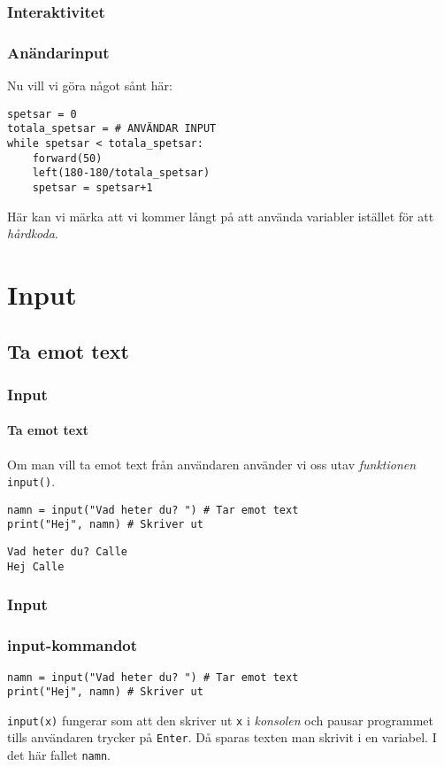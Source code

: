 \documentclass[aspectratio=169]{beamer}
\begin{document}
\begin{frame}[fragile]
	\frametitle{Interaktivitet}
	\frametitle{Anändarinput}
	
	Nu vill vi göra något sånt här:
	
	\begin{lstlisting}
spetsar = 0
totala_spetsar = # ANVÄNDAR INPUT
while spetsar < totala_spetsar:
    forward(50)
    left(180-180/totala_spetsar)
    spetsar = spetsar+1
	\end{lstlisting}
	
	\pause
	
	Här kan vi märka att vi kommer långt på att använda variabler istället för att \textit{hårdkoda}.
	
\end{frame}

\section{Input}

\subsection{Ta emot text}

\begin{frame}[fragile]
	\frametitle{Input}
	\framesubtitle{Ta emot text}
	
	Om man vill ta emot text från användaren använder vi oss utav \textit{funktionen} \texttt{input()}.
	
	\begin{lstlisting}
namn = input("Vad heter du? ") # Tar emot text
print("Hej", namn) # Skriver ut
	\end{lstlisting}
	
	\pause
	
	\begin{lstlisting}
Vad heter du? Calle
Hej Calle
	\end{lstlisting}
	
\end{frame}

\begin{frame}[fragile]
	\frametitle{Input}
	\frametitle{input-kommandot}
	
	\begin{lstlisting}
namn = input("Vad heter du? ") # Tar emot text
print("Hej", namn) # Skriver ut
	\end{lstlisting}
	
	\texttt{input(x)} fungerar som att den skriver ut \texttt{x} i \textit{konsolen} och pausar programmet tills användaren trycker på \texttt{Enter}. Då sparas texten man skrivit i en variabel. I det här fallet \texttt{namn}.

\end{frame}
\end{document}
